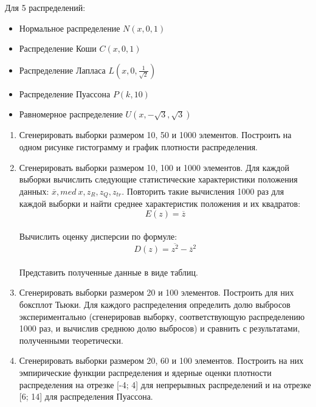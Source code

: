 Для 5 распределений:
\begin{itemize}
	\item Нормальное распределение $N(x, 0, 1)$
	\item Распределение Коши $C(x, 0, 1)$
	\item Распределение Лапласа $L(x, 0, \frac{1}{\sqrt{2}})$
	\item Распределение Пуассона $P(k, 10)$
	\item Равномерное распределение $U(x, -\sqrt{3}, \sqrt{3})$
\end{itemize}

\begin{enumerate}
	\item {Сгенерировать выборки размером 10, 50 и 1000 элементов. Построить на одном рисунке гистограмму и график плотности 		распределения.}

	\item {Сгенерировать выборки размером 10, 100 и 1000 элементов. Для каждой выборки вычислить следующие статистические характеристики положения данных: $\overline{x}, med\ x, z_R, z_Q, z_{tr}$. Повторить такие вычисления 1000 раз для каждой выборки и найти среднее характеристик положения и их квадратов:\\
\begin{equation}E(z)=\overline{z}\end{equation}\\
Вычислить оценку дисперсии по формуле:\\
\begin{equation}D(z)=\overline{z^2}-\overline{z}^2\end{equation}\\
Представить полученные данные в виде таблиц.}
	
	\item {Сгенерировать выборки размером 20 и 100 элементов. Построить для них боксплот Тьюки. Для каждого распределения определить долю выбросов экспериментально (сгенерировав выборку, соответствующую распределению 1000 раз, и вычислив среднюю долю выбросов) и сравнить с результатами, полученными теоретически.}
	
	\item {Сгенерировать выборки размером 20, 60 и 100 элементов. Построить на них эмпирические функции распределения и ядерные оценки плотности распределения на отрезке [-4; 4] для непрерывных распределений и на отрезке [6; 14] для распределения Пуассона.}
\end{enumerate}